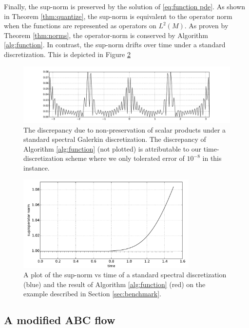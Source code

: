\documentclass[final,leqno]{siamart}
\begin{document}
Finally, the sup-norm is preserved by the solution of \eqref{eq:function pde}.
As shown in Theorem \ref{thm:quantize}, the sup-norm is equivalent to the operator norm when the functions are represented as operators on $L^{2}(M)$.
As proven by Theorem \ref{thm:norms}, the operator-norm is conserved by Algorithm \ref{alg:function}.
In contrast, the sup-norm drifts over time under a standard discretization.  
This is depicted in Figure \ref{fig:norms}

\begin{figure}[h!]
	\hspace*{-1.2cm}
	\includegraphics[width=1.15\textwidth]{./images/function_plots/discrepancy}
	\caption{The discrepancy due to non-preservation of scalar products under a standard spectral Galerkin discretization. 
	The discrepancy of Algorithm \ref{alg:function} (not plotted) is attributable to our time-discretization scheme where we only tolerated error of $10^{-8}$ in this instance.}
	\label{fig:discrepancy}
\end{figure}  

\begin{figure}[h!]
	\hspace*{-1.2cm}
	\centering
	\includegraphics[width=0.8\textwidth]{./images/L_inf_plot.pdf}
	\caption{A plot of the sup-norm vs time of a standard spectral discretization (blue) and the result of Algorithm \ref{alg:function} (red) on the example described in Section \ref{sec:benchmark}.}
	\label{fig:norms}
\end{figure}

\subsection{A modified ABC flow}
\label{sec:ABC_flow}
\end{document}
